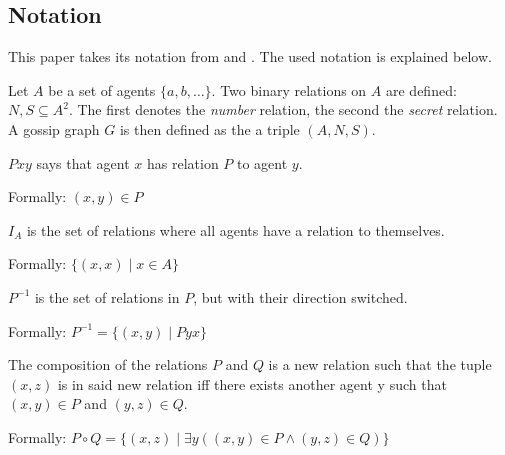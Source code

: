 \subsection{Notation}\label{sec:notation}

This paper takes its notation from \Textcite{van_ditmarsch_dynamic_2018} and \Textcite{van_ditmarsch_strengthening_2019}.
The used notation is explained below.

\begin{definition}[Gossip graph]
    Let \(A\) be a set of agents \(\{a, b, \dots\}\).
    Two binary relations on \(A\) are defined: \(N, S \subseteq A^2\).
    The first denotes the \textit{number} relation, the second the \textit{secret} relation.
    A gossip graph \(G\) is then defined as the a triple \((A, N, S)\).
\end{definition}


\begin{subdefinition}
    \(Pxy\) says that agent \(x\) has relation \(P\) to agent \(y\).
    
    Formally: \((x, y) \in P\)
    \label{def:rel-bin}
\end{subdefinition}

\begin{subdefinition}
    \(I_A\) is the set of relations where all agents have a relation to themselves.
    
    Formally: \(\{(x,x) \mid x \in A\}\)
    \label{def:rel-id}
\end{subdefinition}

\begin{subdefinition}
    \(P^{-1}\) is the set of relations in \(P\), but with their direction switched.

    Formally: \(P^{-1} = \{(x,y) \mid Pyx\}\)
    \label{def:rel-conv}
\end{subdefinition}

\begin{subdefinition}
    The composition of the relations \(P\) and \(Q\) is a new relation such that the tuple \((x,z)\) is in said new relation iff there exists another agent y such that \((x,y) \in P\) and \((y,z) \in Q\).

    Formally: \(P \circ Q = \{(x,z) \mid \exists y ((x, y) \in P \land (y, z) \in Q) \}\)
    \label{def:rel-comp}
\end{subdefinition}

